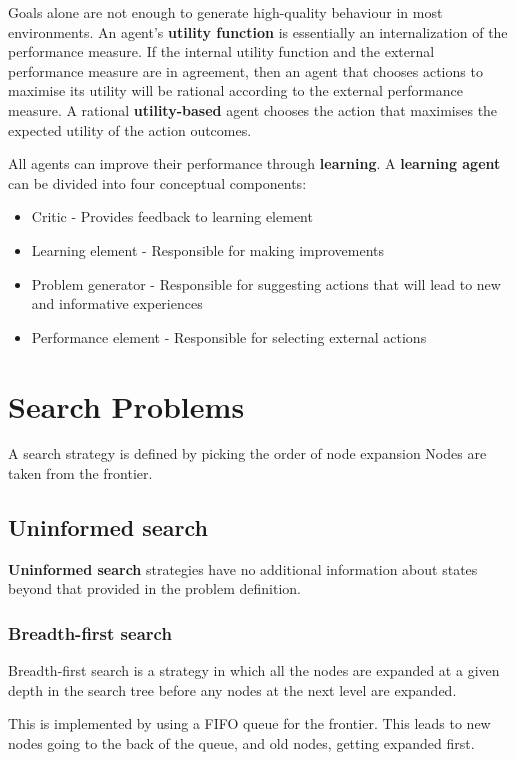 \documentclass{article}
\begin{document}
Goals alone are not enough to generate high-quality behaviour in most environments. An agent's \textbf{utility function} is essentially an internalization of the performance measure. If the internal utility function and the external performance measure are in agreement, then an agent that chooses actions to maximise its utility will be rational according to the external performance measure. A rational \textbf{utility-based} agent chooses the action that maximises the expected utility of the action outcomes. \newline

All agents can improve their performance through \textbf{learning}. A \textbf{learning agent} can be divided into four conceptual components:
\begin{itemize}
    \item Critic - Provides feedback to learning element
    \item Learning element - Responsible for making improvements
    \item Problem generator - Responsible for suggesting actions that will lead to new and informative experiences
    \item Performance element - Responsible for selecting external actions
\end{itemize}

\section{Search Problems}

A search strategy is defined by picking the order of node expansion
Nodes are taken from the frontier. 

\subsection{Uninformed search}

\textbf{Uninformed search} strategies have no additional information about states beyond that provided in the problem definition. 

\subsubsection{Breadth-first search}

Breadth-first search is a strategy in which all the nodes are expanded at a given depth in the search tree before any nodes at the next level are expanded. 

This is implemented by using a FIFO queue for the frontier. This leads to new nodes going to the back of the queue, and old nodes, getting expanded first. 
\end{document}

